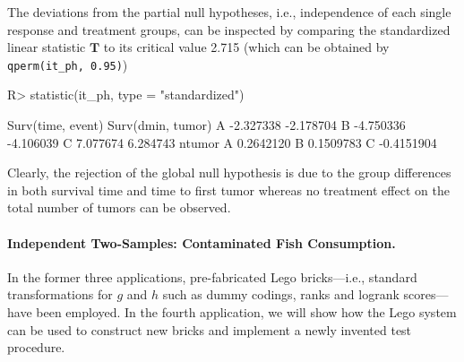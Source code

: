 \documentclass{article}
\newcommand{\T}{\mathbf{T}}
\newenvironment{Schunk}{}{}
\begin{document}
The deviations from the partial null hypotheses, i.e., independence of
each single response and treatment groups, can be inspected by comparing the standardized
linear statistic $\T$ to its critical value 2.715
(which can be obtained by \verb+qperm(it_ph, 0.95)+)
\begin{Schunk}
\begin{Sinput}
R> statistic(it_ph, type = "standardized")
\end{Sinput}
\begin{Soutput}
  Surv(time, event) Surv(dmin, tumor)
A         -2.327338         -2.178704
B         -4.750336         -4.106039
C          7.077674          6.284743
      ntumor
A  0.2642120
B  0.1509783
C -0.4151904
\end{Soutput}
\end{Schunk}
Clearly, the rejection of the global null hypothesis is due to the
group differences in both survival time and time to first tumor whereas 
no treatment effect on the total number of tumors can be observed.

\paragraph{Independent Two-Samples: Contaminated Fish Consumption.}

In the former three applications, pre-fabricated Lego bricks---i.e.,
standard transformations for $g$ and $h$ such as dummy codings, ranks
and logrank scores---have been employed.
In the fourth application, we will show how the Lego system can be used
to construct new bricks and implement a newly invented test procedure. 
\end{document}
